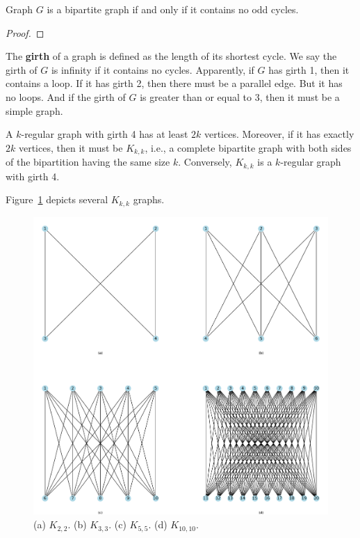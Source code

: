 \documentclass[thmcnt=section, 12pt, color=cyan]{my-elegantbook}
\begin{document}




\begin{theorem} \label{thm:1}
	Graph $G$ is a bipartite graph 
	if and only if 
	it contains no odd cycles.
\end{theorem}

\begin{proof}
\end{proof}


The \textbf{girth} of a graph is defined as 
the length of its shortest cycle.
We say the girth of $G$ is infinity if it contains no cycles.
Apparently, if $G$ has girth 1, then it contains a loop.
If it has girth 2, then there must be a parallel edge. 
But it has no loops.
And if the girth of $G$ is greater than or equal to 3,
then it must be a simple graph.

\begin{proposition}\label{pro:3}
	A $k$-regular graph with girth 4 has at least $2k$ vertices.
	Moreover, if it has exactly  $2k$ vertices, 
	then it must be $K_{k,k}$, i.e.,
	a complete bipartite graph with both sides of 
	the bipartition having the same size $k$.
	Conversely, $K_{k,k}$ is a $k$-regular graph with girth 4.
\end{proposition}

Figure~\ref{fig:3} depicts several $K_{k,k}$ graphs.

\begin{figure}[ht]
    \centering
    \includegraphics[scale=0.5]{figures/g-003.png}
	\caption{(a) $K_{2,2}$. (b) $K_{3,3}$. (c)  $K_{5,5}$. 
	(d)  $K_{10,10}$.}
    \label{fig:3}
\end{figure}
\end{document}
